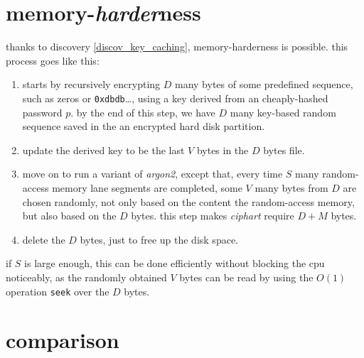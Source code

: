 \documentclass[twocolumn]{article}
\begin{document}
\section{memory-\emph{harder}ness}
thanks to discovery \ref{discov_key_caching}, memory-harderness is
possible.  this process goes like this:
\begin{enumerate}
    \item starts by recursively encrypting $D$ many bytes of some
    predefined sequence, such as zeros or \texttt{0xdbdb}\ldots, using a
    key derived from an cheaply-hashed password $p$.  by the end of this
    step, we have $D$ many key-based random sequence saved in the an
    encrypted hard disk partition.

    \item update the derived key to be the last $V$ bytes in the $D$ bytes
    file.

    \item move on to run a variant of \emph{argon2}, except that, every
    time $S$ many random-access memory lane segments are completed, some
    $V$ many bytes from $D$ are chosen randomly, not only based on the
    content the random-access memory, but also based on the $D$ bytes.
    this step makes \emph{ciphart} require $D+M$ bytes.

    \item delete the $D$ bytes, just to free up the disk space.
\end{enumerate}

if $S$ is large enough, this can be done efficiently without blocking the
cpu noticeably, as the randomly obtained $V$ bytes can be read by using
the $O(1)$ operation \texttt{seek} over the $D$ bytes.

\section{comparison}
\end{document}
